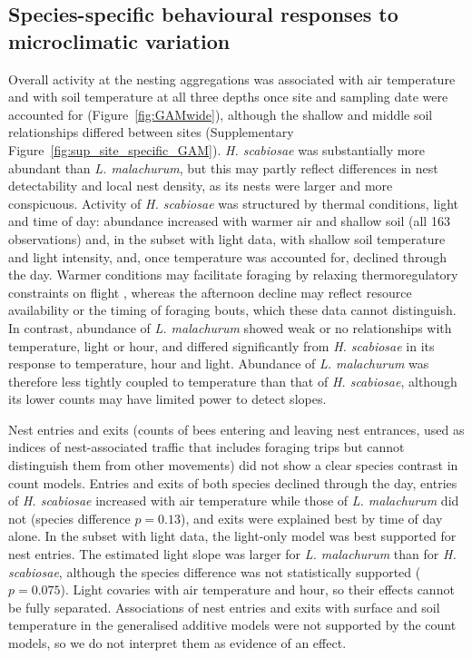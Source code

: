 \documentclass[11pt,a4paper]{article}
\begin{document}
\subsection{Species-specific behavioural responses to microclimatic variation}

Overall activity at the nesting aggregations was associated with air temperature and with soil temperature at all three depths once site and sampling date were accounted for (Figure~\ref{fig:GAMwide}), although the shallow and middle soil relationships differed between sites (Supplementary Figure~\ref{fig:sup_site_specific_GAM}). \textit{H. scabiosae} was substantially more abundant than \textit{L. malachurum}, but this may partly reflect differences in nest detectability and local nest density, as its nests were larger and more conspicuous. Activity of \textit{H. scabiosae} was structured by thermal conditions, light and time of day: abundance increased with warmer air and shallow soil (all 163 observations) and, in the subset with light data, with shallow soil temperature and light intensity, and, once temperature was accounted for, declined through the day. Warmer conditions may facilitate foraging by relaxing thermoregulatory constraints on flight \citep{Willmer2004,Lienhard2010}, whereas the afternoon decline may reflect resource availability or the timing of foraging bouts, which these data cannot distinguish. In contrast, abundance of \textit{L. malachurum} showed weak or no relationships with temperature, light or hour, and differed significantly from \textit{H. scabiosae} in its response to temperature, hour and light. Abundance of \textit{L. malachurum} was therefore less tightly coupled to temperature than that of \textit{H. scabiosae}, although its lower counts may have limited power to detect slopes.

Nest entries and exits (counts of bees entering and leaving nest entrances, used as indices of nest-associated traffic that includes foraging trips but cannot distinguish them from other movements) did not show a clear species contrast in count models. Entries and exits of both species declined through the day, entries of \textit{H. scabiosae} increased with air temperature while those of \textit{L. malachurum} did not (species difference $p = 0.13$), and exits were explained best by time of day alone. In the subset with light data, the light-only model was best supported for nest entries. The estimated light slope was larger for \textit{L. malachurum} than for \textit{H. scabiosae}, although the species difference was not statistically supported ($p = 0.075$). Light covaries with air temperature and hour, so their effects cannot be fully separated. Associations of nest entries and exits with surface and soil temperature in the generalised additive models were not supported by the count models, so we do not interpret them as evidence of an effect. 
\end{document}
